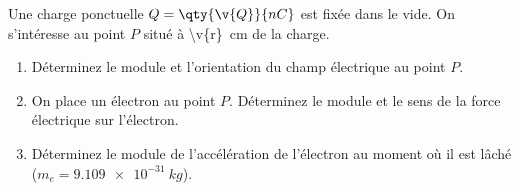 Une charge ponctuelle $Q = \qty{\v{Q}}{nC}$ est fixée dans le vide. On s'intéresse au point $P$ situé à \qty{\v{r}}{cm} de la charge.

\begin{enumerate}[label=\alph*)]
    \item Déterminez le module et l'orientation du champ électrique au point $P$.
    \item On place un électron au point $P$. Déterminez le module et le sens de la force électrique sur l'électron.
    \item Déterminez le module de l'accélération de l'électron au moment où il est lâché ($m_e = \qty{9.109e-31}{kg}$).
\end{enumerate}
